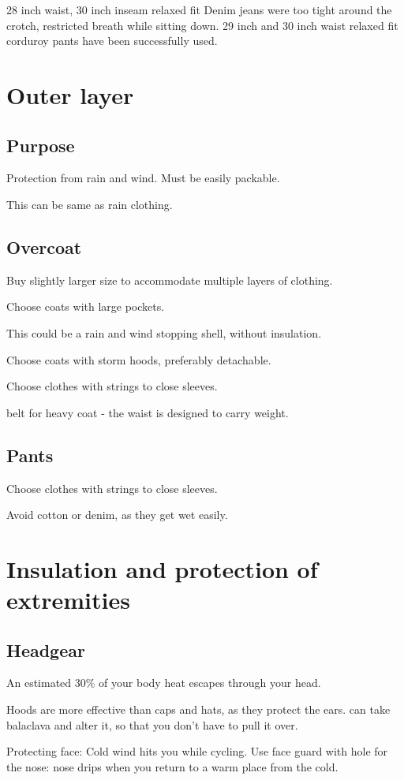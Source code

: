 \documentclass[oneside, article]{memoir}
\begin{document}
28 inch waist, 30 inch inseam relaxed fit Denim jeans were too tight around the crotch, restricted breath while sitting down. 29 inch and 30 inch waist relaxed fit corduroy pants have been successfully used.

\section{Outer layer}
\subsection{Purpose}
Protection from rain and wind. Must be easily packable.

This can be same as rain clothing.

\subsection{Overcoat}
Buy slightly larger size to accommodate multiple layers of clothing.

Choose coats with large pockets.

This could be a rain and wind stopping shell, without insulation.

Choose coats with storm hoods, preferably detachable.

Choose clothes with strings to close sleeves.

belt for heavy coat - the waist is designed to carry weight.

\subsection{Pants}
Choose clothes with strings to close sleeves.

Avoid cotton or denim, as they get wet easily.

\section{Insulation and protection of extremities}
\subsection{Headgear}
An estimated 30\% of your body heat escapes through your head.

Hoods are more effective than caps and hats, as they protect the ears. can take balaclava and alter it, so that you don't have to pull it over.

Protecting face: Cold wind hits you while cycling. Use face guard with hole for the nose: nose drips when you return to a warm place from the cold.
\end{document}
